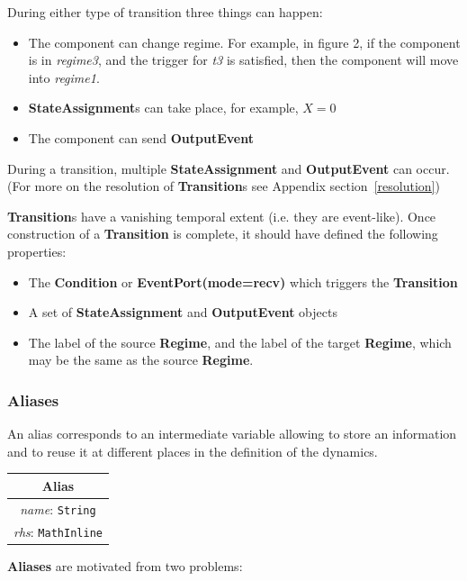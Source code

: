 \documentclass{article}
\newcommand{\nmlClass}[1]{{\bf #1}}
\newcommand{\StateAssignment}{{\bf{StateAssignment}}\xspace}
\newcommand{\OutputEvent}{{\bf{OutputEvent}}\xspace}
\begin{document}
During either type of transition three things can happen:
\begin{itemize}
\item The component can change regime. For example, in figure 2, if
the component is in \emph{regime3}, and the trigger for \emph{t3} is
satisfied, then the component will move into \emph{regime1}.
\item \textbf{StateAssignment}s can take place, for example, $X=0$
\item The component can send \OutputEvent
\end{itemize}

During a transition, multiple \StateAssignment and \OutputEvent can occur.
(For more on the resolution of \nmlClass{Transition}s see Appendix
section~\ref{resolution})

\nmlClass{Transition}s have a vanishing temporal extent (i.e. they are
event-like). Once construction of a \nmlClass{Transition} is complete, it
should have defined the following properties:
\begin{itemize}
\item The \nmlClass{Condition} or \nmlClass{EventPort(mode=recv)} which
triggers the \nmlClass{Transition}
\item A set of \StateAssignment and \OutputEvent objects
\item The label of the source \nmlClass{Regime}, and the label of the target
\nmlClass{Regime}, which may be the same as the source \nmlClass{Regime}.
\end{itemize}

\subsubsection{Aliases}
\label{alias}

An alias corresponds to an intermediate variable allowing to store an
information and to reuse it at different places in the definition of
the dynamics.

\begin{table}[htb]
\center
\begin{tabular}{|c|}
\hline
\hline
Alias \\
\hline
\hline
{\em name}: {\tt String} \\
\hline
{\em rhs}: {\tt MathInline} \\
\hline
\end{tabular}
\end{table}

\textbf{Aliases} are motivated from two problems:
\end{document}
